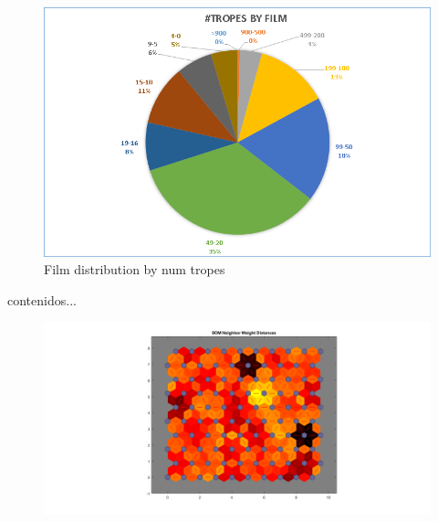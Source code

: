 \documentclass[letterpaper]{article}
\begin{document}
\begin{figure}
	\centering
	\includegraphics[width=0.9\linewidth]{../images/num_tropes_by_film}
	\caption{Film distribution by num tropes}
	\label{fig:numtropesbyfilm}
\end{figure}

\begin{center}
	contenidos...
\begin{figure}
	\centering
	\includegraphics[width=1.25\linewidth]{../images/som_matlab_tropes_15_9}
	\caption{}
	\label{fig:sommatlabtropes159}
\end{figure}
\end{center}
\end{document}
